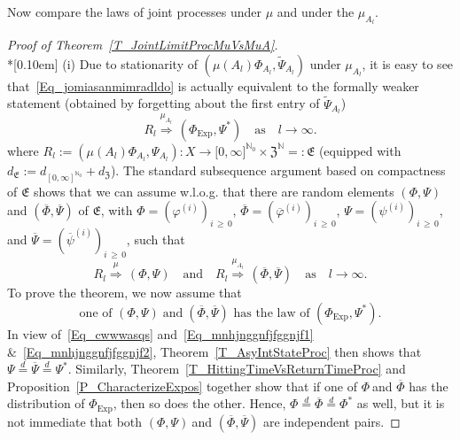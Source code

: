 \documentclass[AHL,Unicode,longabstracts]{cedram}
\newcommand{\Expl}{\mathrm{Exp}}
\newcommand{\frkE}{\mathfrak{E}}
\newcommand{\frkZ}{\mathfrak{Z}}
\newcommand{\bbN}{\mathbb{N}}
\begin{document}
Now compare the laws of joint processes under $\mu$ and under the $\mu_{A_{l}}$.

\begin{proof}[{Proof of Theorem~\ref{T_JointLimitProcMuVsMuA}}]\ \\*[0.10em]
\noindent (i) Due to stationarity of $(\mu(A_{l})\Phi_{A_{l}},\widetilde{\Psi}_{A_{l}})$ under $\mu_{A_{l}}$, it is easy to see that~\eqref{Eq_jomiasanmimradldo} is actually equivalent to the formally weaker statement (obtained by forgetting about the first entry of $\widetilde{\Psi}_{A_{l}}$)
\begin{equation}
R_{l}\overset{\mu_{A_{l}}}{\Longrightarrow}\,\left(\Phi_{\Expl},\Psi^{\ast}\right)\quad\text{as}\quad l\rightarrow\infty.
\end{equation}
where $R_{l}:=(\mu(A_{l})\Phi_{A_{l}},\Psi_{A_{l}}):X\rightarrow
\lbrack0,\infty]^{\bbN_{0}}\times\frkZ^{\bbN} =:\frkE$ (equipped with $d_{\frkE}:=d_{[0,\infty]^{\bbN _{0}}}+d_{\frkZ}$). The standard subsequence argument based on compactness of $\frkE$ shows that we can assume w.l.o.g. that there are random elements $(\Phi,\Psi)$ and $(\overline{\Phi},\overline{\Psi})$ of $\frkE$, with $\Phi=(\varphi^{(i)})_{i\,\geq\,0}$, $\overline{\Phi }=(\overline{\varphi}^{(i)})_{i\,\geq\,0}$, $\Psi=(\psi^{(i)})_{i\,\geq\,0}$, and $\overline{\Psi}=(\overline{\psi}^{(i)})_{i\,\geq\,0}$, such that
\begin{equation}\label{Eq_cwwwasqs}
R_{l}\overset{\mu}{\Longrightarrow}\,(\Phi,\Psi)\quad\text{and} \quad R_{l}\overset{\mu_{A_{l}}}{\Longrightarrow}\,\left(\overline{\Phi},\overline{\Psi}\right)\quad\text{as}\quad l\rightarrow\infty. 
\end{equation}
To prove the theorem, we now assume that
\begin{equation}
\text{one of }(\Phi,\Psi)\; \text{and}\;\left(\overline{\Phi},\overline{\Psi}\right)\text{ has the law of }\left(\Phi_{\Expl},\Psi^{\ast}\right)\text{.}
\end{equation}
In view of~\eqref{Eq_cwwwasqs} and~\eqref{Eq_mnhjnggnfjfggnjf1} \&~\eqref{Eq_mnhjnggnfjfggnjf2}, Theorem~\ref{T_AsyIntStateProc} then shows that $\Psi\overset{d}{=}\overline{\Psi}\overset{d}{=}\Psi^{\ast}$. Similarly, Theorem~\ref{T_HittingTimeVsReturnTimeProc} and Proposition~\ref{P_CharacterizeExpos} together show that if one of $\Phi\ $and $\overline{\Phi}$ has the distribution of $\Phi_{\Expl}$, then so does the other. Hence, $\Phi\overset{d}{=}\overline{\Phi}\overset{d}{=}\Phi^{\ast}$ as well, but it is not immediate that both $(\Phi,\Psi)\ $and $(\overline {\Phi},\overline{\Psi})$ are independent pairs.



\end{proof}
\end{document}
